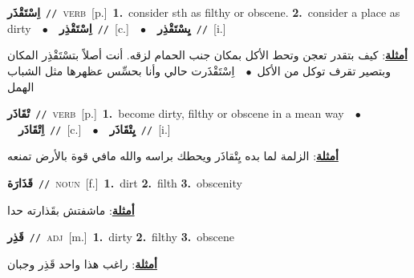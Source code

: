 \documentclass[10pt,a4paper,twoside]{article} %
\begin{document}
\begin{multicols}{2}
{\setlength\topsep{0pt}\textbf{\foreignlanguage{arabic}{اِسْتَقْذَر}}\ {\color{gray}\texttt{//}\color{black}}\ \textsc{verb}\ [p.]\ \textbf{1.}~consider sth as filthy or obscene.  \textbf{2.}~consider a place as dirty\ \ $\bullet$\ \ \setlength\topsep{0pt}\textbf{\foreignlanguage{arabic}{اِسْتَقْذِر}}\ {\color{gray}\texttt{//}\color{black}}\ [c.]\ \ $\bullet$\ \ \setlength\topsep{0pt}\textbf{\foreignlanguage{arabic}{يِسْتَقْذِر}}\ {\color{gray}\texttt{//}\color{black}}\ [i.]\  \begin{flushright}\color{gray}\foreignlanguage{arabic}{\textbf{\underline{\foreignlanguage{arabic}{أمثلة}}}: كيف بتقدر تعجن وتحط الأكل بمكان جنب الحمام لزقه. أنت أصلاً بتسْتَقْذِر المكان وبتصير تقرف توكل من الأكل\ $\bullet$\ \  اِسْتَقْذَرت حالي وأنا بحسِّس عظهرها مثل الشباب الهمل}\end{flushright}\color{black}} \vspace{2mm}

{\setlength\topsep{0pt}\textbf{\foreignlanguage{arabic}{تْقَاذَر}}\ {\color{gray}\texttt{//}\color{black}}\ \textsc{verb}\ [p.]\ \textbf{1.}~become dirty, filthy or obscene in a mean way\ \ $\bullet$\ \ \setlength\topsep{0pt}\textbf{\foreignlanguage{arabic}{اِتْقَاذَر}}\ {\color{gray}\texttt{//}\color{black}}\ [c.]\ \ $\bullet$\ \ \setlength\topsep{0pt}\textbf{\foreignlanguage{arabic}{يِتْقَاذَر}}\ {\color{gray}\texttt{//}\color{black}}\ [i.]\  \begin{flushright}\color{gray}\foreignlanguage{arabic}{\textbf{\underline{\foreignlanguage{arabic}{أمثلة}}}: الزلمة لما بده يِتْقاذَر ويحطك براسه والله مافي قوة بالأرض تمنعه}\end{flushright}\color{black}} \vspace{2mm}

{\setlength\topsep{0pt}\textbf{\foreignlanguage{arabic}{قَذَارَة}}\ {\color{gray}\texttt{//}\color{black}}\ \textsc{noun}\ [f.]\ \textbf{1.}~dirt  \textbf{2.}~filth  \textbf{3.}~obscenity\  \begin{flushright}\color{gray}\foreignlanguage{arabic}{\textbf{\underline{\foreignlanguage{arabic}{أمثلة}}}: ماشفتش بقَذارته حدا}\end{flushright}\color{black}} \vspace{2mm}

{\setlength\topsep{0pt}\textbf{\foreignlanguage{arabic}{قَذِر}}\ {\color{gray}\texttt{//}\color{black}}\ \textsc{adj}\ [m.]\ \textbf{1.}~dirty  \textbf{2.}~filthy  \textbf{3.}~obscene\  \begin{flushright}\color{gray}\foreignlanguage{arabic}{\textbf{\underline{\foreignlanguage{arabic}{أمثلة}}}: راغب هذا واحد قَذِر وجبان}\end{flushright}\color{black}} \vspace{2mm}


\end{multicols}
\end{document}
